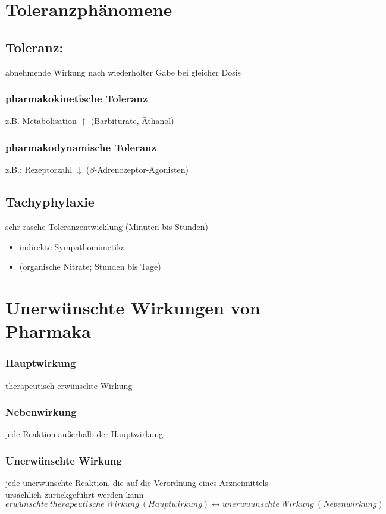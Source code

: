 \documentclass[10pt,a4paper]{report}
\begin{document}
\section{Toleranzphänomene}
\subsection{Toleranz:} abnehmende Wirkung nach wiederholter Gabe bei gleicher Dosis
\subsubsection{pharmakokinetische Toleranz} z.B. Metabolisation $\uparrow$ (Barbiturate, Äthanol)
\subsubsection{pharmakodynamische Toleranz} z.B.: Rezeptorzahl $\downarrow$ ($\beta$-Adrenozeptor-Agonisten)
\subsection{Tachyphylaxie}
sehr rasche Toleranzentwicklung (Minuten bis Stunden)
\begin{itemize}
	\item indirekte Sympathomimetika
	\item (organische Nitrate; Stunden bis Tage)
\end{itemize}
\section{Unerwünschte Wirkungen von Pharmaka}
\subsubsection{Hauptwirkung} therapeutisch erwünschte Wirkung
\subsubsection{Nebenwirkung} jede Reaktion außerhalb der Hauptwirkung
\subsubsection{Unerwünschte Wirkung} jede unerwünschte Reaktion, die auf die Verordnung eines Arzneimittels ursächlich zurückgeführt werden kann
\begin{equation}
erw\ddot{u}nschte\:therapeutische\:Wirkung\:(Hauptwirkung) \longleftrightarrow  unerw\ddot{u}unschte\:Wirkung\:(Nebenwirkung)
\end{equation}
\end{document}
